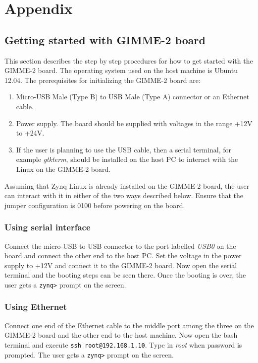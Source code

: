 \section{Appendix}
\subsection{Getting started with GIMME-2 board}\label{sec:first_appendix}
This section describes the step by step procedures for how to get started with the GIMME-2 board. The operating system used on the host machine is Ubuntu 12.04. The prerequisites for initializing the GIMME-2 board are:\begin{enumerate}
\item Micro-USB Male (Type B) to USB Male (Type A) connector or an Ethernet cable.
\item Power supply. The board should be supplied with voltages in the range +12V to +24V.
\item If the user is planning to use the USB cable, then a serial terminal, for example \textit{gtkterm}, should be installed on the host PC to interact with the Linux on the GIMME-2 board.
\end{enumerate}

Assuming that Zynq Linux is already installed on the GIMME-2 board, the user can interact with it in either of the two ways described below. Ensure that the jumper configuration is 0100 before powering on the board.
\subsubsection{Using serial interface}
Connect the micro-USB to USB connector to the port labelled \textit{USB0} on the board and connect the other end to the host PC. Set the voltage in the power supply to +12V and connect it to the GIMME-2 board. Now open the serial terminal and the booting steps can be seen there. Once the booting is over, the user gets a \texttt{zynq>} prompt on the screen.

\subsubsection{Using Ethernet}
Connect one end of the Ethernet cable to the middle port among the three on the GIMME-2 board and the other end to the host machine. Now open the bash terminal and execute
\texttt{ssh root@192.168.1.10}. Type in \textit{root} when password is prompted. The user gets a \texttt{zynq>} prompt on the screen.

